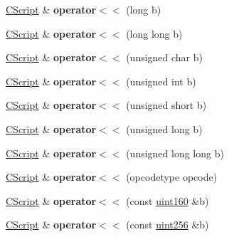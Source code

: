 \begin{DoxyCompactItemize}
\mbox{\label{class_c_script_ab7ef0495ce132d037a1e9b4a587cb85d}} 
\mbox{\hyperlink{class_c_script}{C\+Script}} \& {\bfseries operator$<$$<$} (long b)
\item 
\mbox{\label{class_c_script_a0c0586f1299a5616d90ca15a892224e0}} 
\mbox{\hyperlink{class_c_script}{C\+Script}} \& {\bfseries operator$<$$<$} (long long b)
\item 
\mbox{\label{class_c_script_aff101499fddf174a76ebfb26703a623f}} 
\mbox{\hyperlink{class_c_script}{C\+Script}} \& {\bfseries operator$<$$<$} (unsigned char b)
\item 
\mbox{\label{class_c_script_a40ad78fa50bf8c0c123d4d7dd6f312f5}} 
\mbox{\hyperlink{class_c_script}{C\+Script}} \& {\bfseries operator$<$$<$} (unsigned int b)
\item 
\mbox{\label{class_c_script_a53021b06198de8c0e1b90573ab40288a}} 
\mbox{\hyperlink{class_c_script}{C\+Script}} \& {\bfseries operator$<$$<$} (unsigned short b)
\item 
\mbox{\label{class_c_script_a776d16c903e9247168478d4a4a1657ec}} 
\mbox{\hyperlink{class_c_script}{C\+Script}} \& {\bfseries operator$<$$<$} (unsigned long b)
\item 
\mbox{\label{class_c_script_a025a2179fab8da2ae60ee23652dc276e}} 
\mbox{\hyperlink{class_c_script}{C\+Script}} \& {\bfseries operator$<$$<$} (unsigned long long b)
\item 
\mbox{\label{class_c_script_af22201e1171b6390b4a06678d00c78d3}} 
\mbox{\hyperlink{class_c_script}{C\+Script}} \& {\bfseries operator$<$$<$} (opcodetype opcode)
\item 
\mbox{\label{class_c_script_a9f0b6c18779332fab3e59f862ed95dea}} 
\mbox{\hyperlink{class_c_script}{C\+Script}} \& {\bfseries operator$<$$<$} (const \mbox{\hyperlink{classuint160}{uint160}} \&b)
\item 
\mbox{\label{class_c_script_a5711a24350f1d24baa88d23ed1ca5868}} 
\mbox{\hyperlink{class_c_script}{C\+Script}} \& {\bfseries operator$<$$<$} (const \mbox{\hyperlink{classuint256}{uint256}} \&b)

\end{DoxyCompactItemize}
